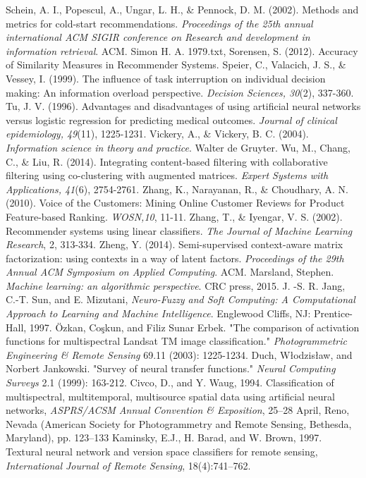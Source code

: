 \documentclass[12pt]{article}
\begin{document}
\begin{thebibliography}{100}
 Schein, A. I., Popescul, A., Ungar, L. H., \& Pennock, D. M. (2002). Methods and metrics for cold-start recommendations. \textit{Proceedings of the 25th annual international ACM SIGIR conference on Research and development in information retrieval}. ACM.
 Simon H. A. 1979.txt,
 Sorensen, S. (2012). Accuracy of Similarity Measures in Recommender Systems.
 Speier, C., Valacich, J. S., \& Vessey, I. (1999). The influence of task interruption on individual decision making: An information overload perspective. \textit{Decision Sciences, 30}(2), 337-360.
 Tu, J. V. (1996). Advantages and disadvantages of using artificial neural networks versus logistic regression for predicting medical outcomes. \textit{Journal of clinical epidemiology, 49}(11), 1225-1231.
 Vickery, A., \& Vickery, B. C. (2004). \textit{Information science in theory and practice}. Walter de Gruyter.
 Wu, M., Chang, C., \& Liu, R. (2014). Integrating content-based filtering with collaborative filtering using co-clustering with augmented matrices. \textit{Expert Systems with Applications, 41}(6), 2754-2761.
 Zhang, K., Narayanan, R., \& Choudhary, A. N. (2010). Voice of the Customers: Mining Online Customer Reviews for Product Feature-based Ranking. \textit{WOSN,10}, 11-11.
 Zhang, T., \& Iyengar, V. S. (2002). Recommender systems using linear classifiers. \textit{The Journal of Machine Learning Research}, 2, 313-334.
 Zheng, Y. (2014). Semi-supervised context-aware matrix factorization: using contexts in a way of latent factors. \textit{Proceedings of the 29th Annual ACM Symposium on Applied Computing}. ACM.
 Marsland, Stephen. \textit{Machine learning: an algorithmic perspective}. CRC press, 2015.
 J. -S. R. Jang, C.-T. Sun, and E. Mizutani, \textit{Neuro-Fuzzy and Soft Computing: A Computational Approach to Learning and Machine Intelligence}. Englewood Cliffs, NJ: Prentice-Hall, 1997.
 Özkan, Coşkun, and Filiz Sunar Erbek. "The comparison of activation functions for multispectral Landsat TM image classification." \textit{Photogrammetric Engineering \& Remote Sensing} 69.11 (2003): 1225-1234.
 Duch, Włodzisław, and Norbert Jankowski. "Survey of neural transfer functions." \textit{Neural Computing Surveys} 2.1 (1999): 163-212.
 Civco, D., and Y. Waug, 1994. Classification of multispectral, multitemporal, multisource spatial data using artificial neural networks, \textit{ASPRS/ACSM Annual Convention \& Exposition}, 25–28 April, Reno, Nevada (American Society for Photogrammetry and Remote Sensing, Bethesda, Maryland), pp. 123–133 
 Kaminsky, E.J., H. Barad, and W. Brown, 1997. Textural neural network and version space classifiers for remote sensing, \textit{International Journal of Remote Sensing}, 18(4):741–762.

\end{thebibliography} 

\begin{flushleft}

\end{flushleft}

\bigskip
\end{document}
